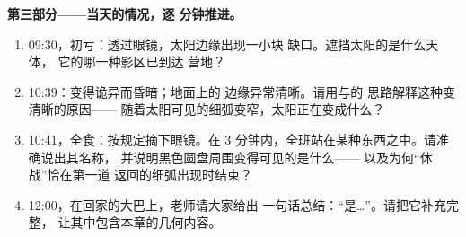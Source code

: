 \begin{problem}
\medskip\noindent\textbf{第三部分——当天的情况，逐
分钟推进。}
\begin{enumerate}[resume]
  \item 09:30，初亏：透过眼镜，太阳边缘出现一小块
        缺口。遮挡太阳的是什么天体，
        它的哪一种影区已到达
        营地？
  \item 10:39：变得诡异而昏暗；地面上的
        边缘异常清晰。请用与的
        思路解释这种变清晰的原因——
        随着太阳可见的细弧变窄，太阳正在变成什么？
  \item 10:41，全食：按规定摘下眼镜。在 $3$
        分钟内，全班站在某种东西之中。请准确说出其名称，
        并说明黑色圆盘周围变得可见的是什么——
        以及为何“休战”恰在第一道
        返回的细弧出现时结束？
  \item 12:00，在回家的大巴上，老师请大家给出
        一句话总结：“是\dots”。请把它补充完整，
        让其中包含本章的几何内容。
\end{enumerate}
\end{problem}
